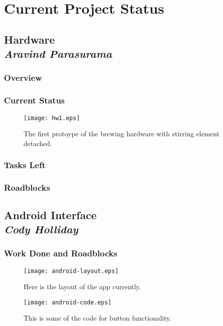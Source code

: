 \documentclass[draftclsnofoot,onecolumn,letterpaper,10pt]{IEEEtran}
\begin{document}
\section{Current Project Status}

\subsection{Hardware\\{\em\textbf{Aravind Parasurama}}}
\subsubsection{Overview}

\subsubsection{Current Status}
\begin{figure}
\label{fig:hw1}
\caption{The first protoype of the brewing hardware with stirring element detached.}
\texttt{[image: hw1.eps]}
\end{figure}

\subsubsection{Tasks Left}

\subsubsection{Roadblocks}

\subsection{Android Interface\\{\em\textbf{Cody Holliday}}}


\subsubsection{Work Done and Roadblocks}

\newpage
\vfill

\begin{figure}
\label{fig:layout}
\caption{Here is the layout of the app currently.}
\texttt{[image: android-layout.eps]}
\end{figure}


\begin{figure}
\label{fig:code}
\caption{This is some of the code for button functionality.}
\texttt{[image: android-code.eps]}
\end{figure}
\end{document}
